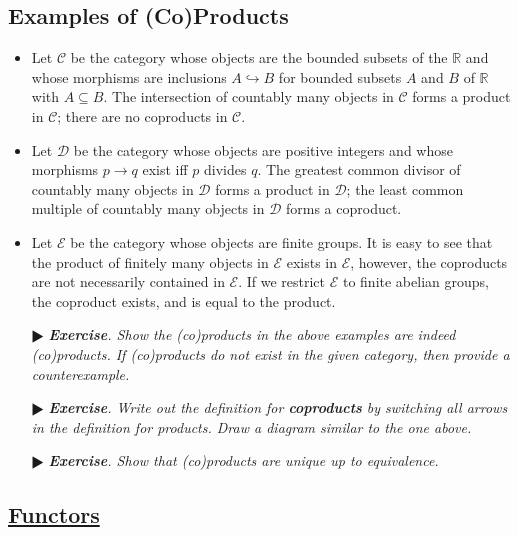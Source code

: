 \documentclass[11pt]{amsart}
\theoremstyle{definition}
\renewcommand\:{\colon}
\newcommand{\calC}{\mathcal{C}}
\newcommand{\calD}{\mathcal{D}}
\newcommand{\R}{\mathds{R}}
\newcommand{\1}{\mathds{1}}
\newcommand{\exc}[1]{\vspace{-2.5pt}\begin{itemize}[leftmargin=15pt]\item[$\RHD$] \textit{\textbf{Exercise}. #1}\end{itemize}}
\begin{document}
\begin{center}
\end{center}

\subsection*{Examples of (Co)Products}
\vspace{-5pt}\begin{itemize}[leftmargin=*]\setlength\itemsep{0em}
	\item Let $\calC$ be the category whose objects are the bounded subsets of the $\R$ and whose morphisms are inclusions $A \hookrightarrow B$ for bounded subsets $A$ and $B$ of $\R$ with $A \subseteq B$. The intersection of countably many objects in $\calC$ forms a product in $\calC$; there are no coproducts in $\calC$.
	\item Let $\calD$ be the category whose objects are positive integers and whose morphisms $p \to q$ exist iff $p$ divides $q$. The greatest common divisor of countably many objects in $\calD$ forms a product in $\calD$; the least common multiple of countably many objects in $\calD$ forms a coproduct.
	\item Let $\mathcal{E}$ be the category whose objects are finite groups. It is easy to see that the product of finitely many objects in $\mathcal{E}$ exists in $\mathcal{E}$, however, the coproducts are not necessarily contained in $\mathcal{E}$. If we restrict $\mathcal{E}$ to finite abelian groups, the coproduct exists, and is equal to the product.
\end{itemize}
\vskip5pt

\exc{Show the (co)products in the above examples are indeed (co)products. If (co)products do not exist in the given category, then provide a counterexample.}
\exc{Write out the definition for \textbf{\textit{coproducts}} by switching all arrows in the definition for products. Draw a diagram similar to the one above.}
\exc{Show that (co)products are unique up to equivalence.}
\vskip20pt

\subsection*{\underline{Functors}}
\end{document}
